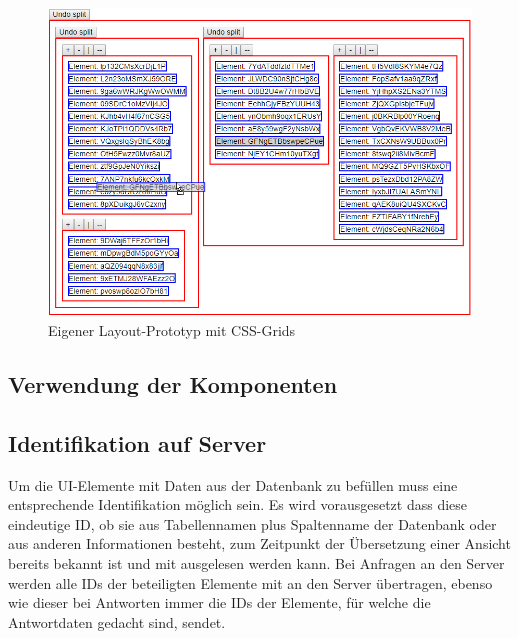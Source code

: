 \begin{figure}
    \centering
    \captionsetup{justification=centering}
    \includegraphics[width=\textwidth]{figures/layout_grid_test.png}
        \caption{Eigener Layout-Prototyp mit CSS-Grids}
        \label{fig:layout_grid_test}
\end{figure}

\subsection{Verwendung der Komponenten}
\subsection{Identifikation auf Server}
Um die UI-Elemente mit Daten aus der Datenbank zu befüllen muss eine entsprechende Identifikation möglich sein. Es wird vorausgesetzt dass diese eindeutige ID, ob sie aus Tabellennamen plus Spaltenname der Datenbank oder aus anderen Informationen besteht, zum Zeitpunkt der Übersetzung einer Ansicht bereits bekannt ist und mit ausgelesen werden kann. Bei Anfragen an den Server werden alle IDs der beteiligten Elemente mit an den Server übertragen, ebenso wie dieser bei Antworten immer die IDs der Elemente, für welche die Antwortdaten gedacht sind, sendet.



